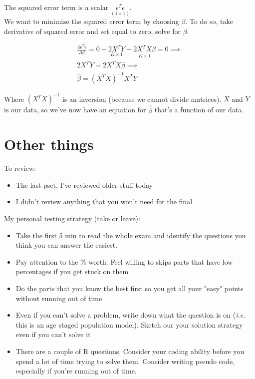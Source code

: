 \documentclass{article}
\begin{document}
The squared error term is a scalar $\underset{(1 \times 1)}{\epsilon^T \epsilon}$. \\

We want to minimize the squared error term by choosing $\beta$. To do so, take derivative of squared error and set equal to zero, solve for $\beta$. 

\begin{align}
    \frac{\partial \epsilon^T  \epsilon }{ \partial \beta} = 0 - \underset{K \times 1}{2X^T Y} + \underset{K \times 1}{2 X^T X \beta} = 0 \implies \\
    2X^T Y = 2 X^T X \beta \implies \\
    \hat \beta = {(X^T X)}^{-1} X^T Y
\end{align}

Where ${(X^T X)}^{-1}$ is an inversion (because we cannot divide matrices). $X$ and $Y$ is our data, so we've now have an equation for $\hat \beta$ that's a function of our data. 


\section{Other things}

To review: 
\begin{itemize}
    \item The last pset, I've reviewed older stuff today 
    \item I didn't review anything that you won't need for the final
\end{itemize}

My personal testing strategy (take or leave): 
\begin{itemize}
    \item Take the first 5 min to read the whole exam and identify the questions you think you can answer the easiest. 
    \item Pay attention to the \% worth. Feel willing to skips parts that have low percentages if you get stuck on them 
    \item Do the parts that you know the best first so you get all your "easy" points without running out of time
    \item Even if you can't solve  a problem, write down what the question is on (\textit{i.e.} this is an age staged population model). Sketch our your solution strategy even if you can't solve it 
    \item There are a couple of R questions. Consider your coding ability before you spend a lot of time trying to solve them. Consider writing pseudo code, especially if you're running out of time.
\end{itemize}
\end{document}
